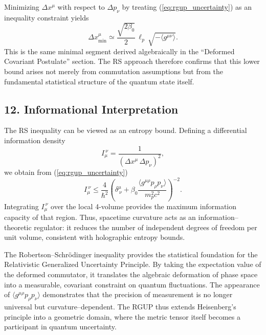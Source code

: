 \documentclass[11pt,oneside]{book}
\newenvironment{booknote}{
  \begin{tcolorbox}[
    colback=gray!3!white,
    colframe=gray!45!black,
    fonttitle=\bfseries,
    title=\textbf{Book Note},
  ]
}{\end{tcolorbox}}
\numberwithin{equation}{chapter}
\newcommand{\lp}{\ell_p}             %
\newcommand{\mpx}{m_p}               %
\newcommand{\betaz}{\beta_0}
\begin{document}
Minimizing $\Delta x^\mu$ with respect to $\Delta p_\nu$
by treating (\ref{eq:rgup_uncertainty}) as an inequality constraint yields
\begin{equation}
\Delta x_{\min}^\mu
\simeq
\frac{\sqrt{2\betaz}}{2}\,
\lp\,
\sqrt{-\langle g^{\mu\nu}\rangle}.
\end{equation}
This is the same minimal segment derived algebraically in the
``Deformed Covariant Postulate'' section.
The RS approach therefore confirms that this lower bound arises
not merely from commutation assumptions but from
the fundamental statistical structure of the quantum state itself.

\subsection*{12. Informational Interpretation}

The RS inequality can be viewed as an entropy bound.
Defining a differential information density
\begin{equation}
I_\mu^{\ \nu} =
\frac{1}{(\Delta x^\mu\,\Delta p_\nu)^2},
\end{equation}
we obtain from (\ref{eq:rgup_uncertainty})
\begin{equation}
I_\mu^{\ \nu}
\le
\frac{4}{\hbar^2}
\left(
\delta^\mu_{\ \nu}
+ \betaz\frac{\langle g^{\mu\rho}p_\rho p_\nu\rangle}{\mpx^2 c^2}
\right)^{-2}.
\end{equation}
Integrating $I_\mu^{\ \nu}$ over the local 4-volume provides
the maximum information capacity of that region.
Thus, spacetime curvature acts as an information--theoretic regulator:
it reduces the number of independent degrees of freedom per unit volume,
consistent with holographic entropy bounds. \vspace{0.8em}

\begin{booknote}
The Robertson--Schrödinger inequality provides the statistical foundation
for the Relativistic Generalized Uncertainty Principle.
By taking the expectation value of the deformed commutator,
it translates the algebraic deformation of phase space into a measurable,
covariant constraint on quantum fluctuations.
The appearance of $\langle g^{\mu\rho}p_\rho p_\nu\rangle$
demonstrates that the precision of measurement is no longer universal but
curvature--dependent.
The RGUP thus extends Heisenberg’s principle into a geometric domain,
where the metric tensor itself becomes a participant in quantum uncertainty.
\end{booknote}
\end{document}

